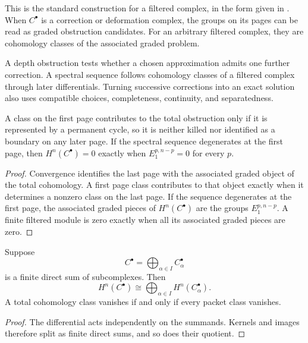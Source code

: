 This is the standard construction for a filtered complex, in the form given in \cite{Weibel1994,McCleary2001}. When $C^\bullet$ is a correction or deformation complex, the groups on its pages can be read as graded obstruction candidates. For an arbitrary filtered complex, they are cohomology classes of the associated graded problem.

\begin{interpretation}[title={Lifting and survival answer different questions}]
A depth obstruction tests whether a chosen approximation admits one further correction. A spectral sequence follows cohomology classes of a filtered complex through later differentials. Turning successive corrections into an exact solution also uses compatible choices, completeness, continuity, and separatedness.
\end{interpretation}

\begin{proposition}\label{prop:fine_obstruction_survival}
A class on the first page contributes to the total obstruction only if it is represented by a permanent cycle, so it is neither killed nor identified as a boundary on any later page.  If the spectral sequence degenerates at the first page, then $H^n(C^\bullet)=0$ exactly when $E_1^{p,n-p}=0$ for every $p$.
\end{proposition}

\begin{proof}
Convergence identifies the last page with the associated graded object of the total cohomology.  A first page class contributes to that object exactly when it determines a nonzero class on the last page.  If the sequence degenerates at the first page, the associated graded pieces of $H^n(C^\bullet)$ are the groups $E_1^{p,n-p}$.  A finite filtered module is zero exactly when all its associated graded pieces are zero.
\end{proof}

\begin{corollary}\label{cor:direct_packet_no_cancellation}
Suppose
\[
C^\bullet=\bigoplus_{\alpha\in I}C_\alpha^\bullet
\]
is a finite direct sum of subcomplexes.  Then
\[
H^n(C^\bullet)
\cong
\bigoplus_{\alpha\in I}H^n(C_\alpha^\bullet).
\]
A total cohomology class vanishes if and only if every packet class vanishes.
\end{corollary}

\begin{proof}
The differential acts independently on the summands.  Kernels and images therefore split as finite direct sums, and so does their quotient.
\end{proof}

